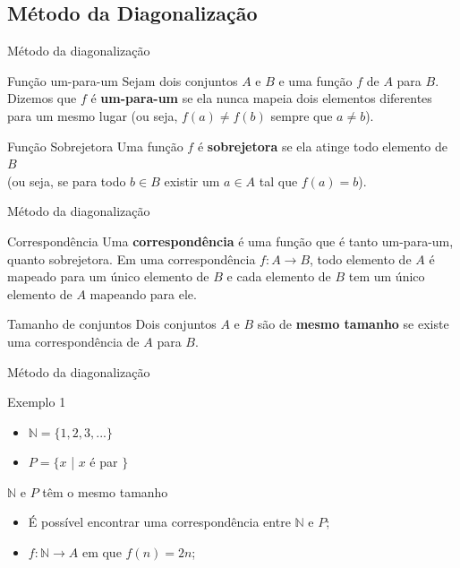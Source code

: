 \documentclass[xcolor=dvipsnames,table]{beamer}
\begin{document}
	\subsection{Método da Diagonalização}
	
	\begin{frame}{Método da diagonalização}
		\begin{block}{Função um-para-um}
			Sejam dois conjuntos $A$ e $B$ e uma função $f$ de $A$ para $B$. Dizemos que $f$ é {\bf um-para-um} se ela nunca mapeia dois elementos diferentes para um mesmo lugar (ou seja, $f(a) \not= f(b)$ sempre que $a \not= b$).
		\end{block}	
		\begin{block}{Função Sobrejetora}		
			Uma função $f$ é {\bf sobrejetora} se ela atinge todo elemento de $B$ \\(ou seja, se para todo $b \in B$ existir um $a \in A$ tal que $f(a) = b$).
		\end{block} 
	\end{frame}
	
	\begin{frame}{Método da diagonalização}
		\begin{block}{Correspondência}
			Uma {\bf correspondência} é uma função que é tanto um-para-um, quanto sobrejetora. Em uma correspondência $f : A \rightarrow B$, todo elemento de $A$ é mapeado para um único elemento de $B$ e cada elemento de $B$ tem um único elemento de $A$ mapeando para ele. 
		\end{block} 
		\begin{block}{Tamanho de conjuntos}
			Dois conjuntos $A$ e $B$ são de {\bf mesmo tamanho} se existe uma correspondência de $A$ para $B$.
		\end{block}
	\end{frame}
	
	\begin{frame}{Método da diagonalização}
		\begin{block}{Exemplo 1}
			\begin{itemize}
				\item $\mathbb{N} = \{ 1, 2, 3, ... \}$
				\item $P = \{ x$ | $x$ é par $\}$
			\end{itemize} 
		\end{block} 
		\begin{block}{$\mathbb{N}$ e $P$ têm o mesmo tamanho} 
			\begin{itemize}
				\item É possível encontrar uma correspondência entre $\mathbb{N}$ e $P$; 
				\item $f:\mathbb{N} \rightarrow A$ em que $f(n) = 2n$;
			\end{itemize}
		\end{block}	
	\end{frame}
	
\end{document}
